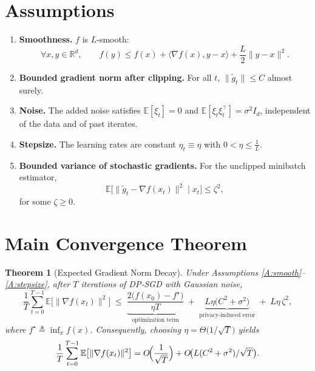 \documentclass[11pt]{article}
\newtheorem{theorem}{Theorem}
\newcommand{\E}{\mathbb{E}}
\newcommand{\R}{\mathbb{R}}
\newcommand{\grad}{\nabla}
\begin{document}
\newpage
\section*{Assumptions}
\begin{enumerate}[label=\textbf{A\arabic*}]
\item \label{A:smooth} \textbf{Smoothness.} $f$ is $L$‑smooth:
\[
\forall x,y\in\R^{d},\qquad
f(y)\le f(x)+\langle\grad f(x),y-x\rangle+\frac{L}{2}\|y-x\|^{2}.
\]
\item \label{A:bound} \textbf{Bounded gradient norm after clipping.}
For all $t$, $\|\tilde g_t\|\le C$ almost surely.
\item \label{A:noise} \textbf{Noise.}
The added noise satisfies $\E[\xi_t]=0$ and $\E[\xi_t\xi_t^{\top}]=\sigma^{2}I_d$,
independent of the data and of past iterates.
\item \label{A:stepsize} \textbf{Stepsize.}
The learning rates are constant $\eta_t\equiv\eta$ with
$0<\eta\le \frac{1}{L}$.
\item \label{A:boundedvar} \textbf{Bounded variance of stochastic gradients.}
For the unclipped minibatch estimator,
\[
\E\bigl[\|\tilde g_t-\grad f(x_t)\|^{2}\mid x_t\bigr]\le \zeta^{2},
\]
for some $\zeta\ge0$.
\end{enumerate}

\section*{Main Convergence Theorem}
\begin{theorem}[Expected Gradient Norm Decay]\label{thm:main}
Under Assumptions \ref{A:smooth}–\ref{A:stepsize}, after $T$ iterations of DP‑SGD with Gaussian noise,
\[
\frac{1}{T}\sum_{t=0}^{T-1}\E\bigl[\|\grad f(x_t)\|^{2}\bigr]
\;\le\;
\underbrace{\frac{2\bigl(f(x_0)-f^{\star}\bigr)}{\eta T}}_{\text{optimization term}}
\;+\;
\underbrace{L\eta\bigl(C^{2}+\sigma^{2}\bigr)}_{\text{privacy‑induced error}}
\;+\;
L\eta\,\zeta^{2},
\]
where $f^{\star}\triangleq\inf_{x}f(x)$.
Consequently, choosing $\eta =\Theta\bigl(1/\sqrt{T}\bigr)$ yields
\[
\frac{1}{T}\sum_{t=0}^{T-1}\E\bigl[\|\grad f(x_t)\|^{2}\bigr]
= O\!\Bigl(\frac{1}{\sqrt{T}}\Bigr)
+ O\!\bigl(L(C^{2}+\sigma^{2})/\sqrt{T}\bigr).
\]
\end{theorem}
\end{document}
